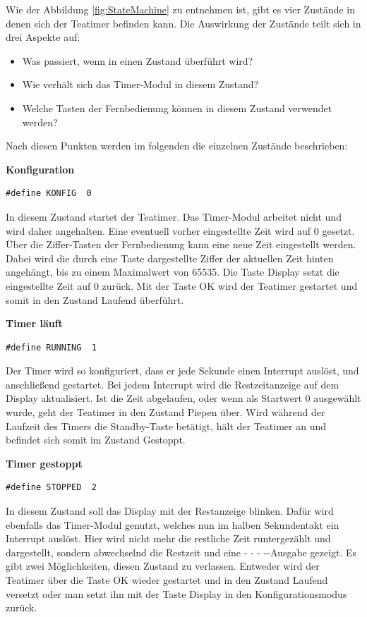 \documentclass[12pt,a4paper,bibliography=totocnumbered,listof=totocnumbered]{scrartcl}
\begin{document}
Wie der Abbildung \ref{fig:StateMachine} zu entnehmen ist, gibt es vier Zustände in denen sich der Teatimer befinden kann. Die Auswirkung der Zustände teilt sich in drei Aspekte auf:
\begin{itemize}
	\item Was passiert, wenn in einen Zustand überführt wird?
	\item Wie verhält sich das Timer-Modul in diesem Zustand?
	\item Welche Tasten der Fernbedienung können in diesem Zustand verwendet werden?
\end{itemize}

Nach diesen Punkten werden im folgenden die einzelnen Zustände beschrieben:

\textbf{Konfiguration}
\begin{lstlisting}
#define KONFIG  0
\end{lstlisting}
In diesem Zustand startet der Teatimer. Das Timer-Modul arbeitet nicht und wird daher angehalten. Eine eventuell vorher eingestellte Zeit wird auf 0 gesetzt. Über die Ziffer-Tasten der Fernbedienung kann eine neue Zeit eingestellt werden. Dabei wird die durch eine Taste dargestellte Ziffer der aktuellen Zeit hinten angehängt, bis zu einem Maximalwert von 65535. Die Taste \glqq Display\grqq{} setzt die eingestellte Zeit auf 0 zurück. Mit der Taste \glqq OK\grqq{} wird der Teatimer gestartet und somit in den Zustand \glqq Laufend\grqq{} überführt.

\textbf{Timer läuft}
\begin{lstlisting}
#define RUNNING  1
\end{lstlisting}
Der Timer wird so konfiguriert, dass er jede Sekunde einen Interrupt auslöst, und anschließend gestartet. Bei jedem Interrupt wird die Restzeitanzeige auf dem Display aktualisiert. Ist die Zeit abgelaufen, oder wenn als Startwert 0 ausgewählt wurde, geht der Teatimer in den Zustand \glqq Piepen\grqq{} über. Wird während der Laufzeit des Timers die \glqq Standby\grqq{}-Taste betätigt, hält der Teatimer an und befindet sich somit im Zustand \glqq Gestoppt\grqq{}.

\textbf{Timer gestoppt}
\begin{lstlisting}
#define STOPPED  2
\end{lstlisting}
In diesem Zustand soll das Display mit der Restanzeige blinken. Dafür wird ebenfalls das Timer-Modul genutzt, welches nun im halben Sekundentakt ein Interrupt auslöst. Hier wird nicht mehr die restliche Zeit runtergezählt und dargestellt, sondern abwechselnd die Restzeit und eine \glqq - - - -\grqq{}-Ausgabe gezeigt. Es gibt zwei Möglichkeiten, diesen Zustand zu verlassen. Entweder wird der Teatimer über die Taste \glqq OK\grqq{} wieder gestartet und in den Zustand \glqq Laufend\grqq{} versetzt oder man setzt ihn mit der Taste \glqq Display\grqq{} in den Konfigurationsmodus zurück.
\end{document}
